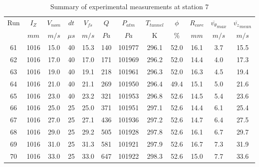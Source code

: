 \begin{table}[H]
\begin{center}
\begin{tabular}{|cccccccccccc|}
	\hline
	Run & $I_Z$ & $V_{nom}$ & $dt$ & $V_{fs}$ & $Q$ & $P_{atm}$ & $T_{tunnel}$ & $\phi$ & $R_{core}$ & $\overline{v_{\theta}}_{max}$ & $\overline{v_{z}}_{mean}$\\
	  & $mm$ & $m/s$ & $\mu s$ & $m/s$ & $Pa$ & $Pa$ & K & $\%$ & $mm$ & $m/s$ & $m/s$\\
	\hline
	61 & 1016 & 15.0 & 40 & 15.3 & 140 & 101977 & 296.1 & 52.0 & 16.1 & 3.7 & 15.5\\
	62 & 1016 & 17.0 & 40 & 17.0 & 171 & 101969 & 296.2 & 52.0 & 14.4 & 4.0 & 17.3\\
	63 & 1016 & 19.0 & 40 & 19.1 & 218 & 101961 & 296.3 & 52.0 & 16.3 & 4.5 & 19.4\\
	64 & 1016 & 21.0 & 40 & 21.1 & 269 & 101950 & 296.4 & 49.4 & 15.1 & 5.0 & 21.6\\
	65 & 1016 & 23.0 & 40 & 23.2 & 321 & 101953 & 296.8 & 52.6 & 14.5 & 5.4 & 23.6\\
	66 & 1016 & 25.0 & 25 & 25.0 & 371 & 101951 & 297.1 & 52.6 & 14.4 & 6.1 & 25.4\\
	67 & 1016 & 27.0 & 25 & 27.1 & 436 & 101936 & 297.2 & 52.6 & 14.7 & 6.4 & 27.5\\
	68 & 1016 & 29.0 & 25 & 29.2 & 505 & 101928 & 297.8 & 52.6 & 16.1 & 6.7 & 29.7\\
	69 & 1016 & 31.0 & 25 & 31.3 & 581 & 101921 & 297.9 & 52.6 & 16.7 & 7.3 & 31.9\\
	70 & 1016 & 33.0 & 25 & 33.0 & 647 & 101922 & 298.3 & 52.6 & 15.0 & 7.7 & 33.6\\
	\hline
\end{tabular}
\caption{Summary of experimental measurements at station 7}
\label{table:experiment_results_7}
\end{center}
\end{table}
